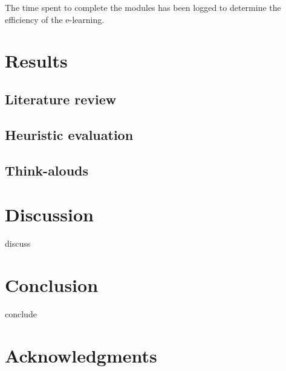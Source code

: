 \documentclass{sigchi}
\begin{document}
The time spent to complete the modules has been logged to determine the efficiency of the e-learning. 




\section{Results}
\subsection{Literature review}

\subsection{Heuristic evaluation}

\subsection{Think-alouds}


\section{Discussion}
discuss

\section{Conclusion}
conclude

\section{Acknowledgments}

\balance{}



\end{document}
